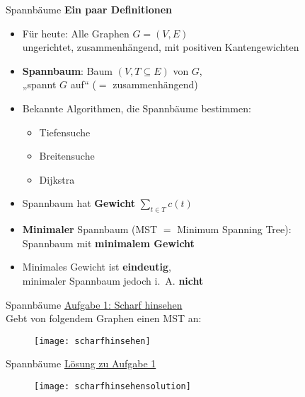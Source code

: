 \begin{frame}{Spannbäume}
	\textbf{Ein paar Definitionen} 
	\begin{itemize}
		\item Für heute: Alle Graphen $G = (V, E)$ \\ 
		ungerichtet, zusammenhängend, mit positiven Kantengewichten
		\pause
		\item \textbf{Spannbaum}: Baum $(V, T \subseteq E)$ von $G$, \\
		„spannt $G$ auf“ ($=$ zusammenhängend)
		\pause
		\item Bekannte Algorithmen, die Spannbäume bestimmen:
		\begin{itemize}
			\item Tiefensuche
			\item Breitensuche
			\item Dijkstra
		\end{itemize}
		\pause
		\item Spannbaum hat \textbf{Gewicht} $ \sum\limits_{t \in T} c(t)$
		\pause
		\item \textbf{Minimaler} Spannbaum (MST $=$ Minimum Spanning Tree): \\ Spannbaum mit \textbf{minimalem Gewicht}
		\pause
		\item Minimales Gewicht ist \textbf{eindeutig}, \\
		minimaler Spannbaum jedoch i.~A. \textbf{nicht}
	\end{itemize}
\end{frame}


\begin{frame}{Spannbäume}
	\underline{Aufgabe 1: Scharf hinsehen} \\
	Gebt von folgendem Graphen einen MST an: \\
	\begin{figure}[htp]
		\centering
		\texttt{[image: scharfhinsehen]}
	\end{figure}
\end{frame}

\begin{frame}{Spannbäume}
	\underline{Lösung zu Aufgabe 1} \\
	\forcenewline
	\begin{figure}[htp]
		\centering
		\texttt{[image: scharfhinsehensolution]}
	\end{figure}
\end{frame}

